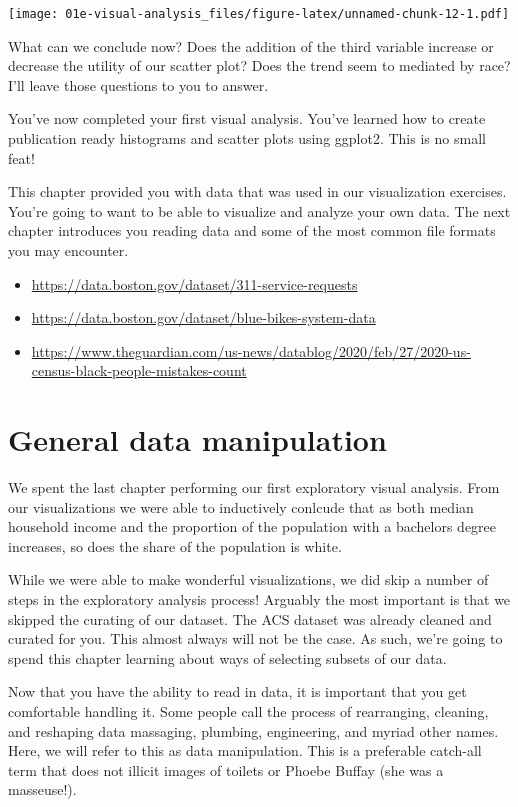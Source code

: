 \documentclass[
]{book}
\providecommand{\tightlist}{%
  \setlength{\itemsep}{0pt}\setlength{\parskip}{0pt}}
\begin{document}
\texttt{[image: 01e-visual-analysis\_files/figure-latex/unnamed-chunk-12-1.pdf]}

What can we conclude now? Does the addition of the third variable increase or decrease the utility of our scatter plot? Does the trend seem to mediated by race? I'll leave those questions to you to answer.

You've now completed your first visual analysis. You've learned how to create publication ready histograms and scatter plots using ggplot2. This is no small feat!

This chapter provided you with data that was used in our visualization exercises. You're going to want to be able to visualize and analyze your own data. The next chapter introduces you reading data and some of the most common file formats you may encounter.

\begin{itemize}
\tightlist
\item
  \url{https://data.boston.gov/dataset/311-service-requests}
\item
  \url{https://data.boston.gov/dataset/blue-bikes-system-data}
\item
  \url{https://www.theguardian.com/us-news/datablog/2020/feb/27/2020-us-census-black-people-mistakes-count}
\end{itemize}

\hypertarget{general-data-manipulation}{%
\chapter{General data manipulation}\label{general-data-manipulation}}

We spent the last chapter performing our first exploratory visual analysis. From our visualizations we were able to inductively conlcude that as both median household income and the proportion of the population with a bachelors degree increases, so does the share of the population is white.

While we were able to make wonderful visualizations, we did skip a number of steps in the exploratory analysis process! Arguably the most important is that we skipped the curating of our dataset. The ACS dataset was already cleaned and curated for you. This almost always will not be the case. As such, we're going to spend this chapter learning about ways of selecting subsets of our data.

Now that you have the ability to read in data, it is important that you get comfortable handling it. Some people call the process of rearranging, cleaning, and reshaping data massaging, plumbing, engineering, and myriad other names. Here, we will refer to this as data manipulation. This is a preferable catch-all term that does not illicit images of toilets or Phoebe Buffay (she was a masseuse!).
\end{document}
